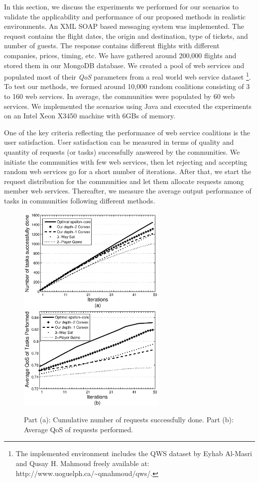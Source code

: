 In this section, we discuss the experiments we performed for our
scenarios to validate the applicability and performance of our
proposed methods in realistic environments.
An XML SOAP based messaging system was implemented. The request
contains the flight dates, the origin and destination, type of
tickets, and number of guests. The response contains different
flights with different companies, prices, timing, etc. We have
gathered around 200,000 flights and stored them in our MongoDB
database. We created a pool of web services and populated most of
their \emph{QoS} parameters from a real world web service dataset
\cite{DBLP:conf/smc/Al-MasriM09a}\footnote[1]{The implemented
environment includes the QWS dataset by Eyhab Al-Masri and Qusay
H. Mahmoud freely available at:
http://www.uoguelph.ca/\textasciitilde{}qmahmoud/qws/.}. To test
our methods, we formed around 10,000 random coalitions consisting
of 3 to 160 web services. In average, the communities were populated by 60 web
services. We implemented the
scenarios using Java and executed the experiments on an Intel Xeon
X3450 machine with 6GBs of memory.

One of the key criteria reflecting the performance of web service
coalitions is the user satisfaction. User satisfaction can be
measured in terms of quality and quantity of requests (or tasks)
successfully answered by the communities. We initiate the
communities with few web services, then let rejecting and
accepting random web services go for a short number of iterations.
After that, we start the request distribution for the communities
and let them allocate requests among member web services.
Thereafter, we measure the average output performance of tasks in
communities following different methods.

\begin{figure}%
\centering
\includegraphics[width=2.8in]{task_done_opt.eps}
\includegraphics[width=2.8in]{task_qos_opt.eps}
\caption{Part (a): Cumulative number of requests successfully
done. Part (b): Average QoS of requests performed.}
\label{performanceall}
\end{figure}


